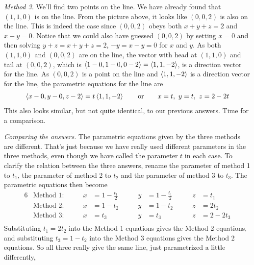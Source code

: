 \begin{eg}
\smallskip
\noindent\emph{Method 3.} We'll find two points on the line. We
have already found that $(1,1,0)$ is on the line. From the picture above,
it looks like $(0,0,2)$ is also on the line. This is indeed the case
since $(0,0,2)$ obeys both $x+y+z=2$ and $x-y=0$. Notice that we could also have
guessed $(0,0,2)$ by setting $x=0$  and then solving $y+z=x+y+z=2$, $-y=x-y=0$
for $x$ and $y$. As both $(1,1,0)$
and $(0,0,2)$ are on the line, the vector with head at $(1,1,0)$ and tail
at $(0,0,2)$, which is $\left< 1-0,1-0,0-2\right> =\left< 1,1,-2\right> $, is a direction vector for the 
line. As $(0,0,2)$ is a point on the line and $\left< 1,1,-2\right> $ is a direction
vector for the line, the parametric equations for the line are
\begin{align*}
\left< x-0,y-0,z-2\right> =t\left< 1,1,-2\right> \qquad\text{or}\qquad
x=t,\ y=t,\ z=2-2t
\end{align*}
This also looks similar, but not quite identical, to our previous answers.
Time for a comparison.

\smallskip
\noindent\emph{Comparing the answers.}
The parametric equations given by the three methods are different. That's
just because we have really used different parameters in the three methods,
even though we have called the parameter $t$ in each case. 
To clarify the relation
between the three answers, rename the parameter of method 1 to $t_1$,
the parameter of method 2 to $t_2$ and the parameter of method 3 to $t_3$.
The parametric equations then become
\begin{alignat*}{6}
&\text{Method 1:}\qquad &
   x&=1-\frac{t_1}{2}\qquad &
   y&=1-\frac{t_1}{2}\qquad & 
   z&=t_1 \\
&\text{Method 2:}\qquad &
   x&=1-t_2\qquad &
   y&=1-t_2\qquad & 
   z&=2t_2 \\
&\text{Method 3:}\qquad &
   x&=t_3\qquad &
   y&=t_3\qquad & 
   z&=2-2t_3 \\
\end{alignat*}  
Substituting $t_1=2t_2$ into the Method 1 equations gives the Method 2
equations, and substituting $t_3=1-t_2$ into the Method 3 equations gives 
the Method 2 equations. So all three really give the same line, just parametrized a little differently,

\end{eg}

